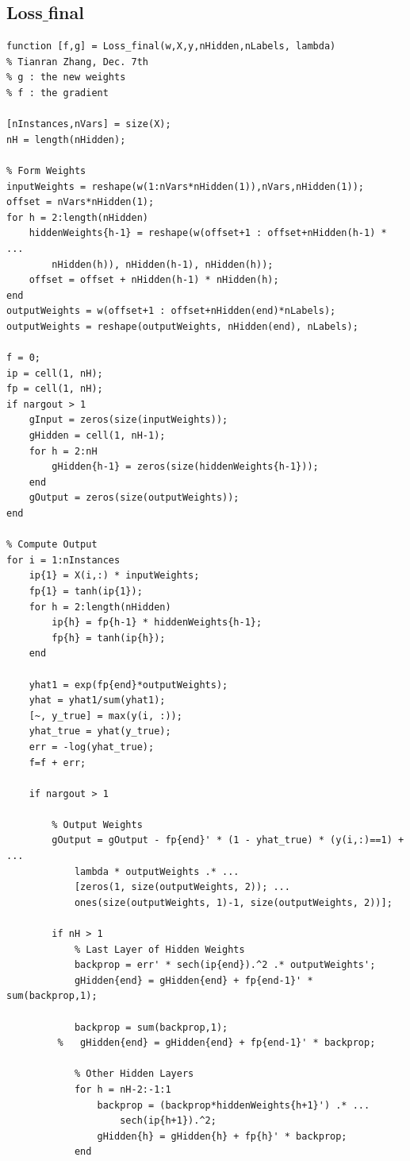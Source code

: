 \documentclass[12pt]{article}
\begin{document}
\subsection{Loss$\_$final}
\begin{lstlisting}
function [f,g] = Loss_final(w,X,y,nHidden,nLabels, lambda)
% Tianran Zhang, Dec. 7th
% g : the new weights
% f : the gradient

[nInstances,nVars] = size(X);
nH = length(nHidden);

% Form Weights
inputWeights = reshape(w(1:nVars*nHidden(1)),nVars,nHidden(1));
offset = nVars*nHidden(1);
for h = 2:length(nHidden)
    hiddenWeights{h-1} = reshape(w(offset+1 : offset+nHidden(h-1) * ...
        nHidden(h)), nHidden(h-1), nHidden(h));
    offset = offset + nHidden(h-1) * nHidden(h);
end
outputWeights = w(offset+1 : offset+nHidden(end)*nLabels);
outputWeights = reshape(outputWeights, nHidden(end), nLabels);

f = 0;
ip = cell(1, nH);
fp = cell(1, nH);
if nargout > 1
    gInput = zeros(size(inputWeights));
    gHidden = cell(1, nH-1);
    for h = 2:nH
        gHidden{h-1} = zeros(size(hiddenWeights{h-1}));
    end
    gOutput = zeros(size(outputWeights));
end

% Compute Output
for i = 1:nInstances
    ip{1} = X(i,:) * inputWeights;
    fp{1} = tanh(ip{1});
    for h = 2:length(nHidden)
        ip{h} = fp{h-1} * hiddenWeights{h-1};
        fp{h} = tanh(ip{h});
    end
    
    yhat1 = exp(fp{end}*outputWeights);
    yhat = yhat1/sum(yhat1);
    [~, y_true] = max(y(i, :));
    yhat_true = yhat(y_true);
    err = -log(yhat_true);
    f=f + err;
    
    if nargout > 1
        
        % Output Weights
        gOutput = gOutput - fp{end}' * (1 - yhat_true) * (y(i,:)==1) + ...
            lambda * outputWeights .* ...
            [zeros(1, size(outputWeights, 2)); ...
            ones(size(outputWeights, 1)-1, size(outputWeights, 2))];      
       
        if nH > 1
            % Last Layer of Hidden Weights
            backprop = err' * sech(ip{end}).^2 .* outputWeights';
            gHidden{end} = gHidden{end} + fp{end-1}' * sum(backprop,1);
            
            backprop = sum(backprop,1);
         %   gHidden{end} = gHidden{end} + fp{end-1}' * backprop;
            
            % Other Hidden Layers
            for h = nH-2:-1:1
                backprop = (backprop*hiddenWeights{h+1}') .* ...
                    sech(ip{h+1}).^2;
                gHidden{h} = gHidden{h} + fp{h}' * backprop;
            end
            

\end{lstlisting}
\end{document}
